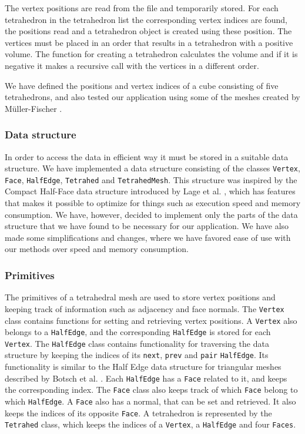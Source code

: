 \documentclass[10pt,a4paper]{article}
\begin{document}
The vertex positions are read from the file and temporarily stored. For each tetrahedron in the tetrahedron list the corresponding vertex indices are found, the positions read and a tetrahedron object is created using these position. The vertices must be placed in an order that results in a tetrahedron with a positive volume. The function for creating a tetrahedron calculates the volume and if it is negative it makes a recursive call with the vertices in a different order.

We have defined the positions and vertex indices of a cube consisting of five tetrahedrons, and also tested our application using some of the meshes created by M\"uller-Fischer \cite{meshes}. 


\subsubsection{Data structure}
In order to access the data in efficient way it must be stored in a suitable data structure. We have implemented a data structure consisting of the classes \texttt{Vertex}, \texttt{Face}, \texttt{HalfEdge}, \texttt{Tetrahed} and \texttt{TetrahedMesh}. This structure was inspired by the Compact Half-Face data structure introduced by Lage et al. \cite{halfface}, which has features that makes it possible to optimize for things such as execution speed and memory consumption. We have, however, decided to implement only the parts of the data structure that we have found to be necessary for our application. We have also made some simplifications and changes, where we have favored ease of use with our methods over speed and memory consumption.

\subsubsection{Primitives}
The primitives of a tetrahedral mesh are used to store vertex positions and keeping track of information such as adjacency and face normals. The \texttt{Vertex} class contains functions for setting and retrieving vertex positions. A \texttt{Vertex} also belongs to a \texttt{HalfEdge}, and the corresponding \texttt{HalfEdge} is stored for each \texttt{Vertex}. The \texttt{HalfEdge} class contains functionality for traversing the data structure by keeping the indices of its \texttt{next}, \texttt{prev} and \texttt{pair} \texttt{HalfEdge}. Its functionality is similar to the Half Edge data structure for triangular meshes described by Botsch et al. \cite{Botsch}. Each \texttt{HalfEdge} has a \texttt{Face} related to it, and keeps the corresponding index. The \texttt{Face} class also keeps track of which \texttt{Face} belong to which \texttt{HalfEdge}. A \texttt{Face} also has a normal, that can be set and retrieved. It also keeps the indices of its opposite \texttt{Face}. A tetrahedron is represented by the \texttt{Tetrahed} class, which keeps the indices of a \texttt{Vertex}, a \texttt{HalfEdge} and four \texttt{Faces}.
\end{document}
